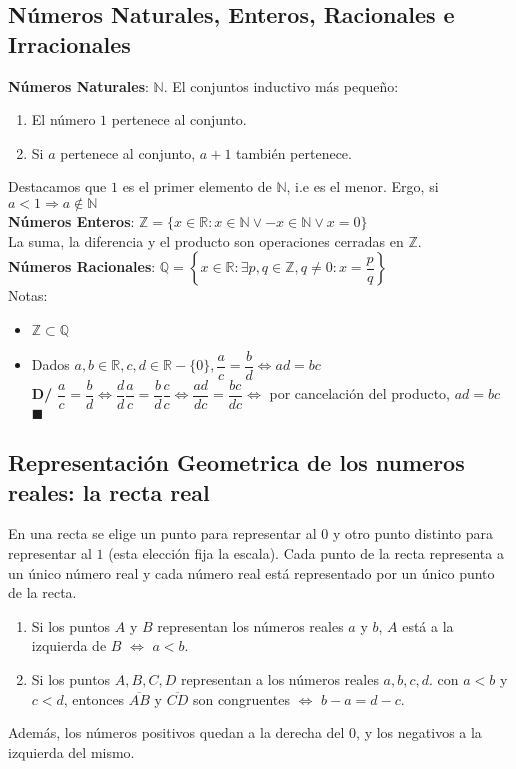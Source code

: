\documentclass[11pt,a4paper]{article}
\newcommand*{\QEDA}{\null\nobreak\hfill\ensuremath{\blacksquare}}
\begin{document}
\subsection{N\'umeros Naturales, Enteros, Racionales e Irracionales}
\noindent \textbf{N\'umeros Naturales}: $\mathbb{N}$. El conjuntos inductivo m\'as peque\~{n}o:
\begin{enumerate}
\item El n\'umero $1$ pertenece al conjunto.
\item Si $a$ pertenece al conjunto, $a+1$ tambi\'en pertenece.
\end{enumerate}
\indent Destacamos que $1$ es el primer elemento de $\mathbb{N}$, i.e es el menor. Ergo, si $a < 1 \Rightarrow a \not \in \mathbb{N}$ \\

\noindent \textbf{N\'umeros Enteros}: $\mathbb{Z} = \{ x \in \mathbb{R} : x \in \mathbb{N} \lor -x \in \mathbb{N} \lor x = 0 \}$\\
\indent La suma, la diferencia y el producto son operaciones cerradas en $\mathbb{Z}$.\\

\noindent \textbf{N\'umeros Racionales}: $\mathbb{Q} = \left\{ x \in \mathbb{R} : \exists p, q \in \mathbb{Z}, q \not = 0 : x = \dfrac{p}{q} \right\}$\\

\noindent Notas:
\begin{itemize}
\item $\mathbb{Z} \subset \mathbb{Q}$ 
\item Dados $a,b \in \mathbb{R}, c,d \in \mathbb{R}-\{0\}, \dfrac{a}{c} = \dfrac{b}{d} \iff ad=bc$\\
\textbf{D/} $\dfrac{a}{c} = \dfrac{b}{d} \iff \dfrac{d}{d} \dfrac{a}{c} = \dfrac{b}{d} \dfrac{c}{c} \iff \dfrac{ad}{dc} = \dfrac{bc}{dc} \iff $ por cancelaci\'on del producto, $ad = bc$ \QEDA\\
\end{itemize}

\subsection{Representaci\'on Geometrica de los numeros reales: la recta real}
\noindent En una recta se elige un punto para representar al $0$ y otro punto distinto para representar al $1$ (esta elecci\'on fija la escala). Cada punto de la recta representa a un \'unico n\'umero real y cada n\'umero real est\'a representado por un \'unico punto de la recta.
\begin{enumerate}
\item Si los puntos $A$ y $B$ representan los n\'umeros reales $a$ y $b$, $A$ est\'a a la izquierda de $B$ $\iff$ $a<b$.
\item Si los puntos $A,B,C,D$ representan a los n\'umeros reales $a,b,c,d$. con $a<b$ y $c<d$, entonces $\overline{AB}$ y $\overline{CD}$ son congruentes $\iff$ $b-a = d - c$.
\end{enumerate}
Adem\'as, los n\'umeros positivos quedan a la derecha del $0$, y los negativos a la izquierda del mismo.
\end{document}
